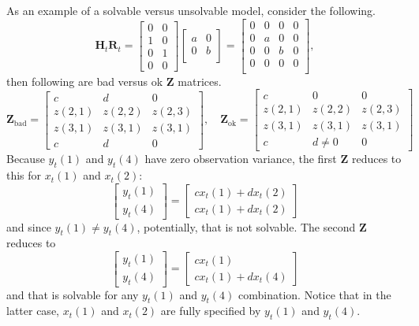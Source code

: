 \documentclass[]{article}
\def\ZZ{\mbox{$\mathbf Z$}}	\def\zz{\mbox{$\mathbf z$}}
\def\HH{\mbox{$\mathbf H$}}	\def\hh{\mbox{$\mathbf h$}}
\def\RR{\mbox{$\mathbf R$}}	 \def\rr{\mbox{$\mathbf r$}}
\begin{document}
As an example of a solvable versus unsolvable model, consider the following.
\begin{equation}
\HH_t\RR_t=\begin{bmatrix}
0&0\\
1&0\\
0&1\\
0&0
\end{bmatrix}
\begin{bmatrix}
a&0\\
0&b\\
\end{bmatrix} = \begin{bmatrix}
0&0&0&0\\
0&a&0&0\\
0&0&b&0\\
0&0&0&0\\\end{bmatrix},
\end{equation}
then following are bad versus ok $\ZZ$ matrices.
\begin{equation}
\ZZ_{\text{bad}}=\begin{bmatrix}
c&d&0\\
z(2,1)&z(2,2)&z(2,3)\\
z(3,1)&z(3,1)&z(3,1)\\
c&d&0
\end{bmatrix},\quad
\ZZ_{\text{ok}}=\begin{bmatrix}
c&0&0\\
z(2,1)&z(2,2)&z(2,3)\\
z(3,1)&z(3,1)&z(3,1)\\
c&d\neq0&0
\end{bmatrix}
\end{equation}
Because $y_t(1)$ and $y_t(4)$ have zero observation variance, the first $\ZZ$ reduces to this for $x_t(1)$ and $x_t(2)$:
\begin{equation}
\begin{bmatrix}
y_t(1)\\
y_t(4)
\end{bmatrix}=
\begin{bmatrix}
c x_t(1) + d x_t(2)\\
c x_t(1) + d x_t(2)
\end{bmatrix}
\end{equation}
and since $y_t(1)\neq y_t(4)$, potentially, that is not solvable.  The second $\ZZ$ reduces to
\begin{equation}
\begin{bmatrix}
y_t(1)\\
y_t(4)
\end{bmatrix}=
\begin{bmatrix}
c x_t(1)\\
c x_t(1) + d x_t(4)
\end{bmatrix}
\end{equation}and that is solvable for any $y_t(1)$ and $y_t(4)$ combination.  Notice that in the latter case, $x_t(1)$ and $x_t(2)$ are fully specified by $y_t(1)$ and $y_t(4)$. 
\end{document}

